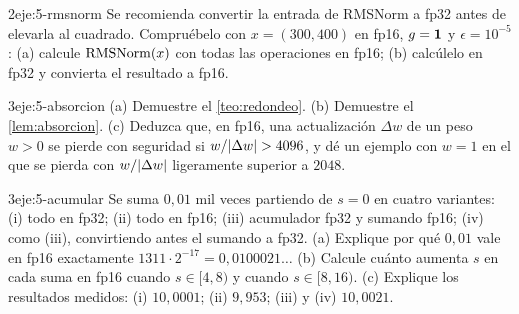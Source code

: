 \begin{ejercicio}{2}{eje:5-rmsnorm}
Se recomienda convertir la entrada de RMSNorm a fp32 antes de elevarla al cuadrado. Compruébelo con $x=(300,400)$ en fp16, $g=\mathbf{1}$ y $\epsilon=10^{-5}$: (a) calcule $\operatorname{RMSNorm}(x)$ con todas las operaciones en fp16; (b) calcúlelo en fp32 y convierta el resultado a fp16.
\end{ejercicio}

\begin{ejercicio}{3}{eje:5-absorcion}
(a) Demuestre el \cref{teo:redondeo}. (b) Demuestre el \cref{lem:absorcion}. (c) Deduzca que, en fp16, una actualización $\Delta w$ de un peso $w>0$ se pierde con seguridad si $w/\lvert\Delta w\rvert>4096$, y dé un ejemplo con $w=1$ en el que se pierda con $w/\lvert\Delta w\rvert$ ligeramente superior a $2048$.
\end{ejercicio}

\begin{ejercicio}{3}{eje:5-acumular}
Se suma $0{,}01$ mil veces partiendo de $s=0$ en cuatro variantes: (i) todo en fp32; (ii) todo en fp16; (iii) acumulador fp32 y sumando fp16; (iv) como (iii), convirtiendo antes el sumando a fp32. (a) Explique por qué $0{,}01$ vale en fp16 exactamente $1311\cdot 2^{-17}=0{,}0100021\ldots$ (b) Calcule cuánto aumenta $s$ en cada suma en fp16 cuando $s\in[4,8)$ y cuando $s\in[8,16)$. (c) Explique los resultados medidos: (i) $10{,}0001$; (ii) $9{,}953$; (iii) y (iv) $10{,}0021$.
\end{ejercicio}
